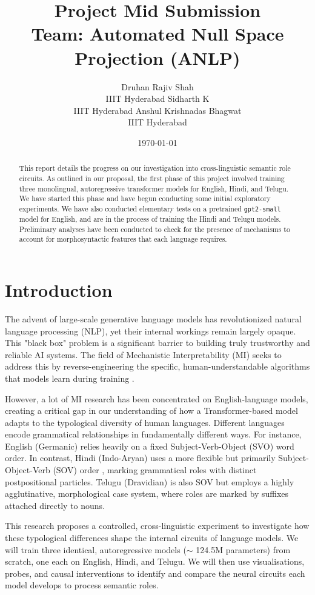 \documentclass[11pt]{article}
\author{Druhan Rajiv Shah \\ IIIT Hyderabad \And Sidharth K \\ IIIT Hyderabad \And Anshul Krishnadas Bhagwat \\ IIIT Hyderabad}
\date{\today}
\title{Project Mid Submission\\\medskip
\large Team: Automated Null Space Projection (ANLP)}
\begin{document}
\maketitle
\begin{abstract}
This report details the progress on our investigation into cross-linguistic semantic role circuits. As outlined in our proposal, the first phase of this project involved training three monolingual, autoregressive transformer models for English, Hindi, and Telugu. We have started this phase and have begun conducting some initial exploratory experiments. We have also conducted elementary tests on a pretrained \texttt{gpt2-small} model for English, and are in the process of training the Hindi and Telugu models. Preliminary analyses have been conducted to check for the presence of mechanisms to account for morphosyntactic features that each language requires.
\end{abstract}
\section*{Introduction}
\label{sec:org1cc1996}

The advent of large-scale generative language models has revolutionized natural language processing (NLP), yet their internal workings remain largely opaque. This "black box" problem is a significant barrier to building truly trustworthy and reliable AI systems. The field of Mechanistic Interpretability (MI) seeks to address this by reverse-engineering the specific, human-understandable algorithms that models learn during training \citep{elhage2021mathematical}.

However, a lot of MI research has been concentrated on English-language models, creating a critical gap in our understanding of how a Transformer-based model adapts to the typological diversity of human languages. Different languages encode grammatical relationships in fundamentally different ways. For instance, English (Germanic) relies heavily on a fixed Subject-Verb-Object (SVO) word order. In contrast, Hindi (Indo-Aryan) uses a more flexible but primarily Subject-Object-Verb (SOV) order \citep{verma1970word}, marking grammatical roles with distinct postpositional particles. Telugu (Dravidian) is also SOV but employs a highly agglutinative, morphological case system, where roles are marked by suffixes attached directly to nouns.

This research proposes a controlled, cross-linguistic experiment to investigate how these typological differences shape the internal circuits of language models. We will train three identical, autoregressive models (\(\sim\) 124.5M parameters) from scratch, one each on English, Hindi, and Telugu. We will then use visualisations, probes, and causal interventions to identify and compare the neural circuits each model develops to process semantic roles.
\end{document}
